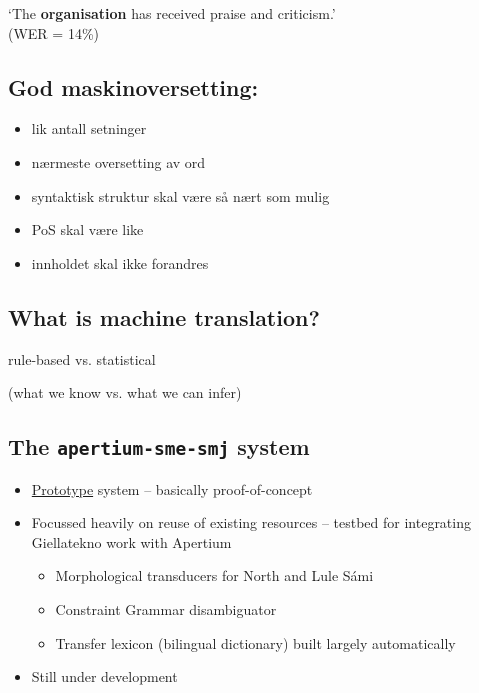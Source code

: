 \documentclass[a4paper,english,12pt]{article}
\begin{document}
\begin{spacing}{1.0}
`The \textbf{organisation} has received praise and criticism.'\\ (WER = 14\%)\\


\subsection{God maskinoversetting:}
\begin{itemize}
  \item lik antall setninger
  \item nærmeste oversetting av ord
  \item syntaktisk struktur skal være så nært som mulig
  \item PoS skal være like
  \item innholdet skal ikke forandres
\end{itemize}
 


 
\subsection{What is machine translation?}

  \begin{centering}

    {\Large rule-based vs. statistical}

    (what we know vs. what we can infer)

  \end{centering}

 


 
\subsection{The {\tt apertium-sme-smj} system}

\begin{itemize}
  \item \underline{Prototype} system -- basically proof-of-concept
  \item Focussed heavily on reuse of existing resources -- testbed for 
    integrating Giellatekno work with Apertium
  \begin{itemize}
    \item Morphological transducers for North and Lule Sámi
    \item Constraint Grammar disambiguator
    \item Transfer lexicon (bilingual dictionary) built largely automatically
  \end{itemize}
  \item Still under development
\end{itemize}


\end{spacing}
\end{document}
